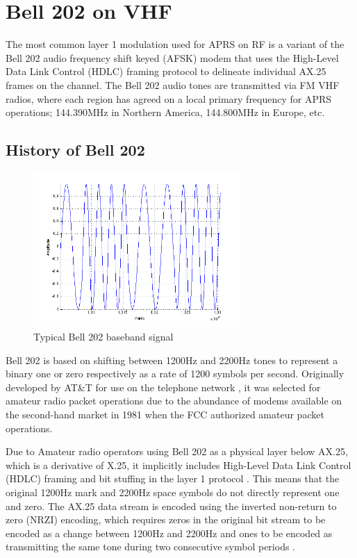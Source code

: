 \chapter{Bell 202 on VHF}
\label{chap:bell202}

The most common layer 1 modulation used for APRS on RF is a variant of the
Bell 202 audio frequency shift keyed (AFSK) modem 
that uses the High-Level Data Link Control (HDLC) framing protocol
to delineate individual AX.25 frames on the channel.
The Bell 202 audio tones are transmitted via 
FM VHF radios, where each region has agreed on a local primary frequency for
APRS operations; 144.390MHz in Northern America, 144.800MHz in Europe, etc.

\section{History of Bell 202}
\label{sec:bell202history}

\begin{figure}
	\centering
	\includegraphics[width=0.7\textwidth]{src/bell202sample}
	\caption{Typical Bell 202 baseband signal}
	\label{fig:bell202sample}
\end{figure}

Bell 202 is based on shifting between 1200Hz and 2200Hz tones to
represent a binary one or zero respectively as a rate of 
1200 symbols per second.
Originally developed by AT\&T for use on the telephone network \cite{202tspec},
it was selected for amateur radio packet operations due to the abundance
of modems available on the second-hand market in 1981 when the FCC authorized
amateur packet operations.

Due to Amateur radio operators
using Bell 202 as a physical layer below AX.25, which is a derivative of
X.25, it implicitly includes High-Level Data Link Control (HDLC) 
framing and bit stuffing in the layer 1 protocol \cite{n1vgphy}.
This means that the original 1200Hz mark and 2200Hz space symbols
do not directly represent one and zero.
The AX.25 data stream is encoded using the 
inverted non-return to zero (NRZI) encoding,
which requires zeros in the original bit stream to be encoded as a change
between 1200Hz and 2200Hz and ones to be encoded as transmitting the same
tone during two consecutive symbol periods \cite{iso13239}.

